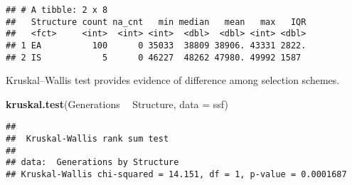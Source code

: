 \documentclass[]{book}
\newenvironment{Shaded}{\begin{snugshade}}{\end{snugshade}}
\newcommand{\CharTok}[1]{\textcolor[rgb]{0.31,0.60,0.02}{#1}}
\newcommand{\DataTypeTok}[1]{\textcolor[rgb]{0.13,0.29,0.53}{#1}}
\newcommand{\DecValTok}[1]{\textcolor[rgb]{0.00,0.00,0.81}{#1}}
\newcommand{\KeywordTok}[1]{\textcolor[rgb]{0.13,0.29,0.53}{\textbf{#1}}}
\newcommand{\NormalTok}[1]{#1}
\newcommand{\OperatorTok}[1]{\textcolor[rgb]{0.81,0.36,0.00}{\textbf{#1}}}
\newcommand{\OtherTok}[1]{\textcolor[rgb]{0.56,0.35,0.01}{#1}}
\newcommand{\StringTok}[1]{\textcolor[rgb]{0.31,0.60,0.02}{#1}}
\begin{document}
\begin{Shaded}
\end{Shaded}

\begin{verbatim}
## # A tibble: 2 x 8
##   Structure count na_cnt   min median   mean   max   IQR
##   <fct>     <int>  <int> <int>  <dbl>  <dbl> <int> <dbl>
## 1 EA          100      0 35033  38809 38906. 43331 2822.
## 2 IS            5      0 46227  48262 47980. 49992 1587
\end{verbatim}

Kruskal--Wallis test provides evidence of difference among selection schemes.

\begin{Shaded}
\begin{Highlighting}[]
\KeywordTok{kruskal.test}\NormalTok{(Generations }\OperatorTok{~}\StringTok{ }\NormalTok{Structure, }\DataTypeTok{data =}\NormalTok{ ssf)}
\end{Highlighting}
\end{Shaded}

\begin{verbatim}
## 
##  Kruskal-Wallis rank sum test
## 
## data:  Generations by Structure
## Kruskal-Wallis chi-squared = 14.151, df = 1, p-value = 0.0001687
\end{verbatim}
\end{document}
